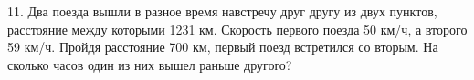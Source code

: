 11. Два поезда вышли в разное время навстречу друг другу из двух пунктов, расстояние между которыми 1231 км. Скорость первого поезда 50 км/ч, а второго 59 км/ч. Пройдя расстояние 700 км, первый поезд встретился со вторым. На сколько часов один из них вышел раньше другого?\\

